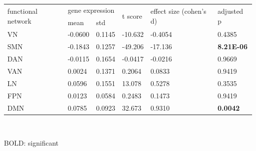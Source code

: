 \begin{refsection}
\begin{table}[H]
\small
{}\selectfont
{} \label{table3S3} 
\centering
\begin{tabular}{@{}llllll@{}}
\hline
\multirow{2}{*}{functional network} & \multicolumn{2}{l}{gene expression} & \multirow{2}{*}{t score} & \multirow{2}{*}{effect size (cohen's d)} & \multirow{2}{*}{adjusted p} \\ \cmidrule(lr){2-3}
                                    & mean              & std             &                          &                                          &                                   \\ \hline 
VN                                  & -0.0600           & 0.1145          & -10.632                  & -0.4054                                  & 0.4385                            \\
SMN                                 & -0.1843           & 0.1257          & -49.206                  & -17.136                                  & \textbf{8.21E-06}                          \\
DAN                                 & -0.0115           & 0.1654          & -0.0417                  & -0.0216                                  & 0.9669                            \\
VAN                                 & 0.0024            & 0.1371          & 0.2064                   & 0.0833                                   & 0.9419                            \\
LN                                  & 0.0596            & 0.1551          & 13.078                   & 0.5278                                   & 0.3535                            \\
FPN                                 & 0.0123            & 0.0584          & 0.2483                   & 0.1473                                   & 0.9419                            \\
DMN                                 & 0.0785            & 0.0923          & 32.673                   & 0.9310                                   & \textbf{0.0042}                            \\ \hline
\end{tabular}\\
{\begin{flushleft}
\scriptsize BOLD: significant
\end{flushleft}}
\end{table}




\end{refsection}
